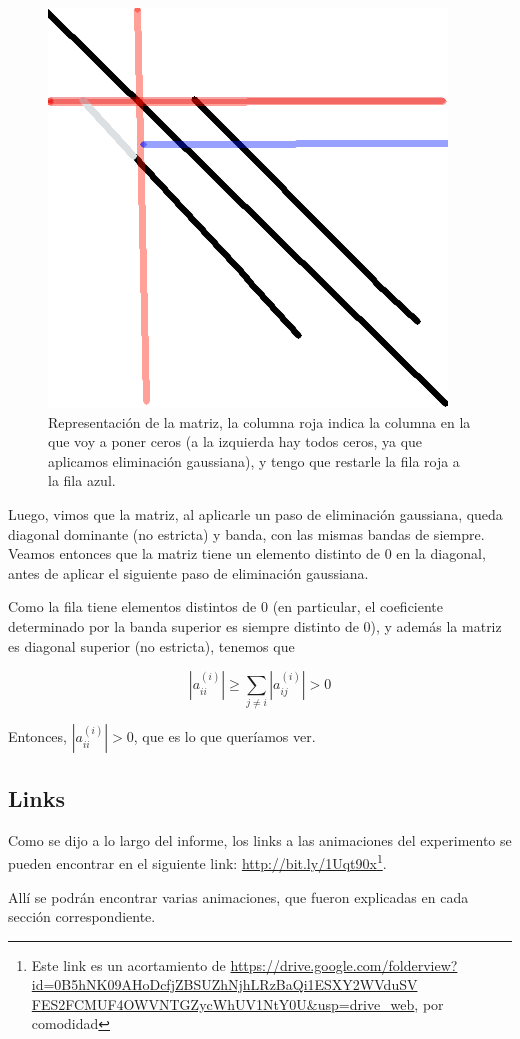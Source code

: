 \begin{figure}[H]
    \begin{center}
\includegraphics[scale=0.3]{imgs/expl.png}
\end{center}
\caption{\footnotesize{Representación de la matriz, la columna roja indica la columna en la que voy a poner ceros (a la izquierda hay todos ceros, ya que aplicamos eliminación gaussiana), y tengo que restarle la fila roja a la fila azul.}}
 \end{figure}

Luego, vimos que la matriz, al aplicarle un paso de eliminación gaussiana, queda diagonal dominante (no estricta) y banda, con las mismas bandas de siempre. Veamos entonces que la matriz tiene un elemento distinto de 0 en la diagonal, antes de aplicar el siguiente paso de eliminación gaussiana.

Como la fila tiene elementos distintos de 0 (en particular, el coeficiente determinado por la banda superior es siempre distinto de 0), y además la matriz es diagonal superior (no estricta), tenemos que

\[
  |a_{ii}^{(i)}| \geq \sum_{j \neq i} |a_{ij}^{(i)}| > 0
\]

Entonces, $|a_{ii}^{(i)}| > 0$, que es lo que queríamos ver.

\subsection{Links}
\label{sec:links}

Como se dijo a lo largo del informe, los links a las animaciones del experimento se pueden encontrar en el siguiente link: \url{http://bit.ly/1Uqt90x}\footnote{Este link es un acortamiento de \newline \url{https://drive.google.com/folderview?id=0B5hNK09AHoDcfjZBSUZhNjhLRzBaQi1ESXY2WVduSV FES2FCMUF4OWVNTGZycWhUV1NtY0U&usp=drive_web}, por comodidad}.

Allí se podrán encontrar varias animaciones, que fueron explicadas en cada sección correspondiente. 

\newpage
\nocite{*}
\printbibliography





